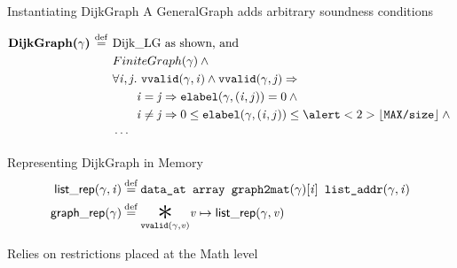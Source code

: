 \documentclass[usenames, xcolor=dvipsnames]{beamer}
\newcommand{\scon}{\mathbin{\ast}}
\renewcommand{\bigstar}{\raisebox{-0.24em}{{\scaleobj{2.5}{\scon}}}}
\newcommand{\defeq}{\mathbin{\overset{\mathrm{def}}{=}}}
\newcommand{\m}[1]{\ensuremath{\mathit{#1}}} %
\newcommand{\p}[1]{\ensuremath{\mathsf{#1}}} %
\begin{document}
\begin{frame}[fragile]{Instantiating DijkGraph}
A GeneralGraph adds arbitrary soundness conditions
\vspace{-1.5em}
\begin{flushleft}
\begin{equation*}
\begin{split}
\textbf{DijkGraph($\gamma$) $\defeq$ \null} &\text{Dijk\_LG as shown, and } \\
                    &FiniteGraph(\gamma) \wedge \null \\
                    &\forall \m{i,j}.~\texttt{vvalid}(\gamma, \m{i}) \wedge \texttt{vvalid}(\gamma, \m{j}) \Rightarrow \\
                    &\qquad \m{i} = \m{j} \Rightarrow \texttt{elabel}(\gamma,(\m{i},{j})) = 0 \wedge \null \\
                    &\qquad \m{i} \neq \m{j} \Rightarrow 0 \le \texttt{elabel}(\gamma,(\m{i},{j})) \le \alert<2>{\lfloor \texttt{MAX/size} \rfloor} \wedge \null \\
                    &\cdots
\end{split}
\end{equation*}
\end{flushleft}
\end{frame}

\begin{frame}{Representing DijkGraph in Memory}
\begin{equation*}
\begin{split}
\p{list\_rep}(\gamma, \m{i}) &\defeq \texttt{data\_at  array  graph2mat}(\gamma)[\m{i}] \texttt{  list\_addr}(\gamma, \m{i}) \\
\vspace{1em}
\p{graph\_rep}(\gamma) &\defeq \underset{\texttt{vvalid}(\gamma,\m{v})}{\bigstar} \m{v}  \mapsto\p{list\_rep}(\gamma, \m{v})
\end{split}
\end{equation*}

\bigskip

\pause 
\quad Relies on restrictions placed at the Math level

\end{frame}
\end{document}
